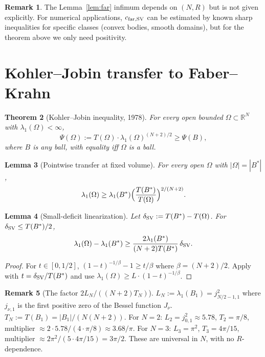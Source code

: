 \documentclass[11pt]{article}
\newtheorem{theorem}{Theorem}
\newtheorem{lemma}[theorem]{Lemma}
\theoremstyle{definition}
\newtheorem{remark}[theorem]{Remark}
\newcommand{\R}{\mathbb{R}}
\newcommand{\abs}[1]{\left|#1\right|}
\begin{document}
\begin{remark}
The Lemma~\ref{lem:far} infimum depends on $(N,R)$ but is not given
explicitly. For numerical applications, $c_{\rm far,SV}$ can be estimated by
known sharp inequalities for specific classes (convex bodies, smooth
domains), but for the theorem above we only need positivity.
\end{remark}

\section{Kohler--Jobin transfer to Faber--Krahn}\label{sec:kj}

\begin{theorem}[Kohler--Jobin inequality, 1978]\label{thm:kj}
For every open bounded $\Omega\subset\R^N$ with $\lambda_1(\Omega)<\infty$,
\[
\Psi(\Omega):=T(\Omega)\cdot\lambda_1(\Omega)^{(N+2)/2}\ge\Psi(B),
\]
where $B$ is any ball, with equality iff $\Omega$ is a ball.
\end{theorem}

\begin{lemma}[Pointwise transfer at fixed volume]\label{lem:transferpt}
For every open $\Omega$ with $\abs{\Omega}=\abs{B^*}$,
\[
\lambda_1(\Omega)\ge\lambda_1(B^*)\Bigl(\frac{T(B^*)}{T(\Omega)}\Bigr)^{2/(N+2)}.
\]
\end{lemma}

\begin{lemma}[Small-deficit linearization]\label{lem:transferlin}
Let $\delta_{\rm SV}:=T(B^*)-T(\Omega)$. For $\delta_{\rm SV}\le T(B^*)/2$,
\[
\lambda_1(\Omega)-\lambda_1(B^*)\ge\frac{2\lambda_1(B^*)}{(N+2)T(B^*)}\,\delta_{\rm SV}.
\]
\end{lemma}

\begin{proof}
For $t\in[0,1/2]$, $(1-t)^{-1/\beta}-1\ge t/\beta$ where $\beta=(N+2)/2$.
Apply with $t=\delta_{\rm SV}/T(B^*)$ and use $\lambda_1(\Omega)\ge L\cdot(1-t)^{-1/\beta}$.
\end{proof}

\begin{remark}[The factor $2L_N/((N+2)T_N)$]
$L_N:=\lambda_1(B_1)=j_{N/2-1,1}^2$ where $j_{\nu,1}$ is the first positive
zero of the Bessel function $J_\nu$. $T_N:=T(B_1)=\abs{B_1}/(N(N+2))$.
For $N=2$: $L_2=j_{0,1}^2\approx5.78$, $T_2=\pi/8$, multiplier
$\approx2\cdot5.78/(4\cdot\pi/8)\approx3.68/\pi$. For $N=3$: $L_3=\pi^2$,
$T_3=4\pi/15$, multiplier $\approx2\pi^2/(5\cdot 4\pi/15)=3\pi/2$.
These are universal in $N$, with no $R$-dependence.
\end{remark}
\end{document}
